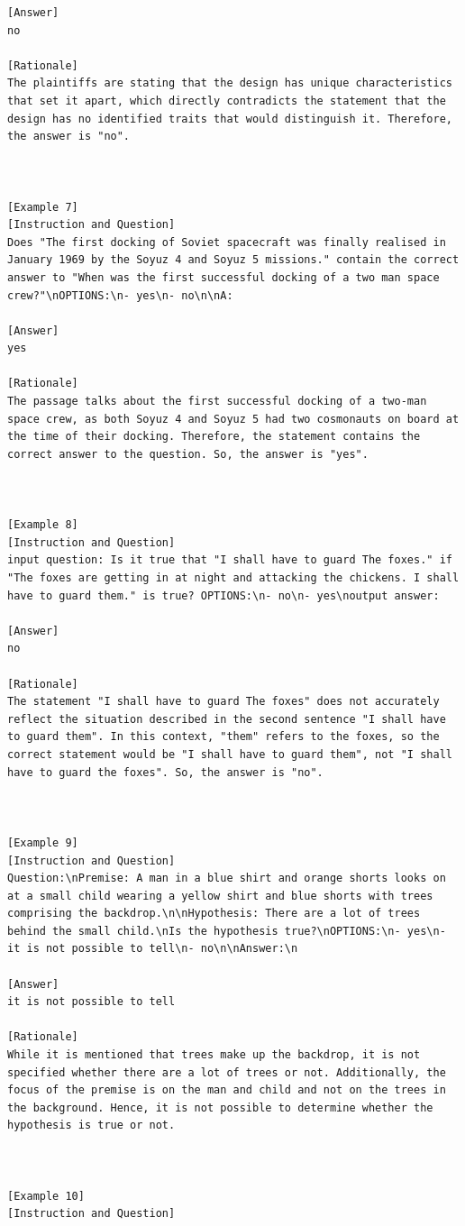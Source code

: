 \begin{lstlisting}[caption={Demonstration used for tasks in family of NLI (FLAN)}, label=nli prompt,captionpos=b]
[Answer]
no

[Rationale]
The plaintiffs are stating that the design has unique characteristics that set it apart, which directly contradicts the statement that the design has no identified traits that would distinguish it. Therefore, the answer is "no".



[Example 7]
[Instruction and Question]
Does "The first docking of Soviet spacecraft was finally realised in January 1969 by the Soyuz 4 and Soyuz 5 missions." contain the correct answer to "When was the first successful docking of a two man space crew?"\nOPTIONS:\n- yes\n- no\n\nA:

[Answer]
yes

[Rationale]
The passage talks about the first successful docking of a two-man space crew, as both Soyuz 4 and Soyuz 5 had two cosmonauts on board at the time of their docking. Therefore, the statement contains the correct answer to the question. So, the answer is "yes".



[Example 8]
[Instruction and Question]
input question: Is it true that "I shall have to guard The foxes." if "The foxes are getting in at night and attacking the chickens. I shall have to guard them." is true? OPTIONS:\n- no\n- yes\noutput answer: 

[Answer]
no

[Rationale]
The statement "I shall have to guard The foxes" does not accurately reflect the situation described in the second sentence "I shall have to guard them". In this context, "them" refers to the foxes, so the correct statement would be "I shall have to guard them", not "I shall have to guard the foxes". So, the answer is "no".



[Example 9]
[Instruction and Question]
Question:\nPremise: A man in a blue shirt and orange shorts looks on at a small child wearing a yellow shirt and blue shorts with trees comprising the backdrop.\n\nHypothesis: There are a lot of trees behind the small child.\nIs the hypothesis true?\nOPTIONS:\n- yes\n- it is not possible to tell\n- no\n\nAnswer:\n

[Answer]
it is not possible to tell

[Rationale]
While it is mentioned that trees make up the backdrop, it is not specified whether there are a lot of trees or not. Additionally, the focus of the premise is on the man and child and not on the trees in the background. Hence, it is not possible to determine whether the hypothesis is true or not.



[Example 10]
[Instruction and Question]
\end{lstlisting}

